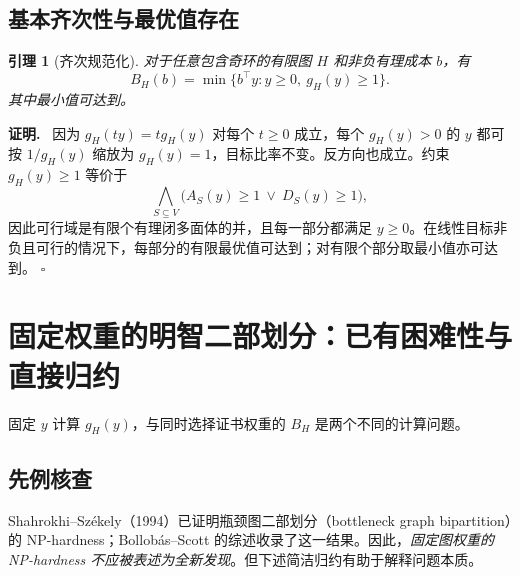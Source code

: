 \documentclass[11pt,a4paper]{ctexart}
\newtheorem{lemma}[theorem]{引理}
\theoremstyle{definition}
\newenvironment{proofcn}{\par\noindent\textbf{证明.}\ }{\hfill$\square$\par}
\newcommand{\1}{\boldsymbol 1}
\begin{document}
\subsection{基本齐次性与最优值存在}
\begin{lemma}[齐次规范化]\label{lem:normalize}
对于任意包含奇环的有限图 $H$ 和非负有理成本 $b$，有
\begin{equation}\label{eq:normalize}
 B_H(b)=\min\{b^\top y:y\ge0,\ g_H(y)\ge1\}.
\end{equation}
其中最小值可达到。
\end{lemma}
\begin{proofcn}
因为 $g_H(ty)=t g_H(y)$ 对每个 $t\ge0$ 成立，每个 $g_H(y)>0$ 的 $y$ 都可按 $1/g_H(y)$ 缩放为 $g_H(y)=1$，目标比率不变。反方向也成立。约束 $g_H(y)\ge1$ 等价于
\[
 \bigwedge_{S\subseteq V}\bigl(A_S(y)\ge1\ \lor\ D_S(y)\ge1\bigr),
\]
因此可行域是有限个有理闭多面体的并，且每一部分都满足 $y\ge0$。在线性目标非负且可行的情况下，每部分的有限最优值可达到；对有限个部分取最小值亦可达到。
\end{proofcn}

\section{固定权重的明智二部划分：已有困难性与直接归约}
固定 $y$ 计算 $g_H(y)$，与同时选择证书权重的 $B_H$ 是两个不同的计算问题。

\subsection{先例核查}
Shahrokhi--Sz\'ekely（1994）已证明瓶颈图二部划分（bottleneck graph bipartition）的 NP-hardness\cite{ShahrokhiSzekely1994}；Bollob\'as--Scott 的综述收录了这一结果\cite{BollobasScott2002}。因此，\emph{固定图权重的 NP-hardness 不应被表述为全新发现}。但下述简洁归约有助于解释问题本质。
\end{document}
